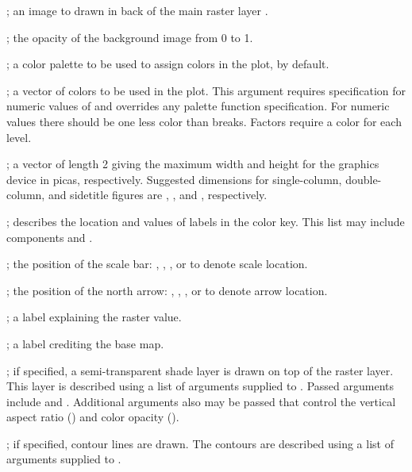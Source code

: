 \documentclass[letterpaper]{book}
\begin{document}
\begin{Arguments}
\begin{ldescription}
\item[\code{bg.image}] ; an image to drawn in back of the main raster layer .
\item[\code{bg.image.alpha}] ; the opacity of the background image from 0 to 1.
\item[\code{pal}] ; a color palette to be used to assign colors in the plot,  by default.
\item[\code{col}] ; a vector of colors to be used in the plot.
This argument requires  specification for numeric values of  and overrides any palette function specification.
For numeric values there should be one less color than breaks. Factors require a color for each level.
\item[\code{max.dev.dim}] ; a vector of length 2 giving the maximum width and height for the graphics device in picas, respectively.
Suggested dimensions for single-column, double-column, and sidetitle figures are , , and , respectively.
\item[\code{labels}] ; describes the location and values of labels in the color key.
This list may include components  and .
\item[\code{scale.loc}] ; the position of the scale bar: , , , or  to denote scale location.
\item[\code{arrow.loc}] ; the position of the north arrow: , , , or  to denote arrow location.
\item[\code{explanation}] ; a label explaining the raster value.
\item[\code{credit}] ; a label crediting the base map.
\item[\code{shade}] ; if specified, a semi-transparent shade layer is drawn on top of the raster layer.
This layer is described using a list of arguments supplied to .
Passed arguments include  and .
Additional arguments also may be passed that control the vertical aspect ratio () and color opacity ().
\item[\code{contour.lines}] ; if specified, contour lines are drawn.
The contours are described using a list of arguments supplied to .

\end{ldescription}
\end{Arguments}
\end{document}
